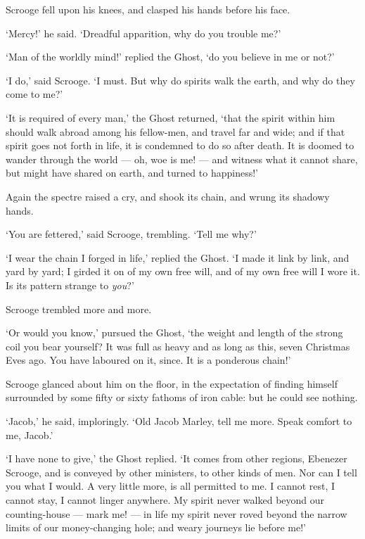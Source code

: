 \documentclass[11pt,twoside]{article}\makeatletter
\begin{document}
Scrooge fell upon his knees, and clasped his hands before his face.  \par
‘Mercy!’ he said.  ‘Dreadful apparition, why do you trouble me?’  \par
‘Man of the worldly mind!’ replied the Ghost, ‘do you believe in me or not?’  \par
‘I do,’ said Scrooge.  ‘I must.  But why do spirits walk the earth, and why do they come to me?’  \par
‘It is required of every man,’ the Ghost returned, ‘that the spirit within him should walk abroad among his fellow-men, and travel far and wide; and if that spirit goes not forth in life, it is condemned to do so after death.  It is doomed to wander through the world — oh, woe is me! — and witness what it cannot share, but might have shared on earth, and turned to happiness!’  \par
Again the spectre raised a cry, and shook its chain, and wrung its shadowy hands.  \par
‘You are fettered,’ said Scrooge, trembling.  ‘Tell me why?’  \par
‘I wear the chain I forged in life,’ replied the Ghost.  ‘I made it link by link, and yard by yard; I girded it on of my own free will, and of my own free will I wore it.  Is its pattern strange to \textit{you}?’  \par
Scrooge trembled more and more.  \par
‘Or would you know,’ pursued the Ghost, ‘the weight and length of the strong coil you bear yourself?  It was full as heavy and as long as this, seven Christmas Eves ago.  You have laboured on it, since.  It is a ponderous chain!’  \par
Scrooge glanced about him on the floor, in the expectation of finding himself surrounded by some fifty or sixty fathoms of iron cable: but he could see nothing.  \par
‘Jacob,’ he said, imploringly.  ‘Old Jacob Marley, tell me more.  Speak comfort to me, Jacob.’  \par
‘I have none to give,’ the Ghost replied.  ‘It comes from other regions, Ebenezer Scrooge, and is conveyed by other ministers, to other kinds of men.  Nor can I tell you what I would.  A very little more, is all permitted to me.  I cannot rest, I cannot stay, I cannot linger anywhere.  My spirit never walked beyond our counting-house — mark me! — in life my spirit never roved beyond the narrow limits of our money-changing hole; and weary journeys lie before me!’  \par
\end{document}

